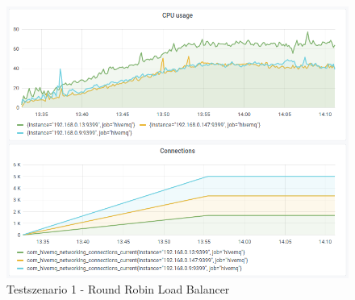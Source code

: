 \begin{figure}
    \centering
    \includegraphics[scale=0.8]{images/s1_rr.png}
    \caption{Testszenario 1 - Round Robin Load Balancer}
    \label{fig:s1-rr}
\end{figure}

